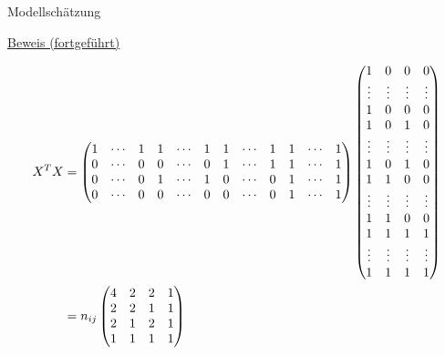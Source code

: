 \documentclass[
  8pt,
  ignorenonframetext,
]{beamer}
\begin{document}
\begin{frame}{Modellschätzung}
\protect\hypertarget{modellschuxe4tzung-9}{}
\footnotesize
\vspace{1mm}

\underline{Beweis (fortgeführt)}

\tiny

\begin{align}
\renewcommand{\arraystretch}{1}
\begin{split}
X^TX
& =
\setcounter{MaxMatrixCols}{20}
\begin{pmatrix}
1 & \cdots & 1 & 1 & \cdots & 1 & 1 & \cdots & 1 & 1 & \cdots & 1   \\
0 & \cdots & 0 & 0 & \cdots & 0 & 1 & \cdots & 1 & 1 & \cdots & 1   \\
0 & \cdots & 0 & 1 & \cdots & 1 & 0 & \cdots & 0 & 1 & \cdots & 1   \\
0 & \cdots & 0 & 0 & \cdots & 0 & 0 & \cdots & 0 & 1 & \cdots & 1   \\
\end{pmatrix}
\begin{pmatrix}
1       &   0       &   0        &  0       \\
\vdots  &   \vdots  &   \vdots   &  \vdots  \\
1       &   0       &   0        &  0       \\
1       &   0       &   1        &  0       \\
\vdots  &   \vdots  &   \vdots   &  \vdots  \\
1       &   0       &   1        &  0       \\
1       &   1       &   0        &  0       \\
\vdots  &   \vdots  &   \vdots   &  \vdots  \\
1       &   1       &   0        &  0       \\
1       &   1       &   1        &  1       \\
\vdots  &   \vdots  &   \vdots   &  \vdots  \\
1       &   1       &   1        &  1       \\
\end{pmatrix}
\\
&
=
n_{ij}
\begin{pmatrix*}[r]
4 & 2 & 2 & 1 \\
2 & 2 & 1 & 1 \\
2 & 1 & 2 & 1 \\
1 & 1 & 1 & 1
\end{pmatrix*}
\end{split}
\end{align}
\end{frame}
\end{document}
